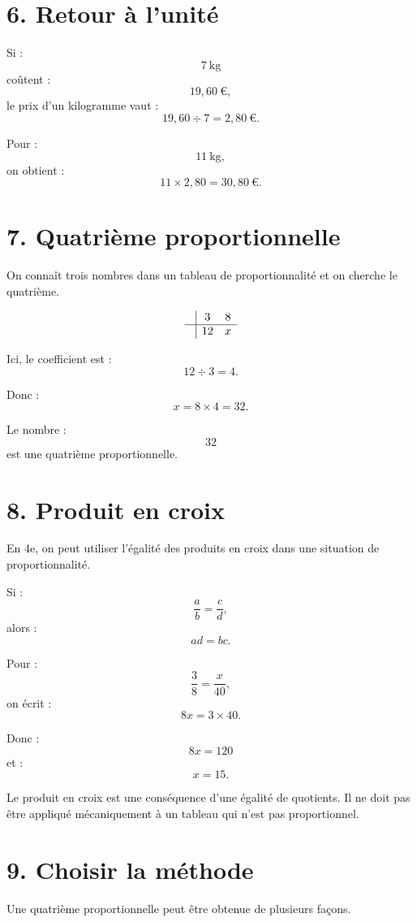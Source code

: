 \section{6. Retour à l'unité}

Si :
\[
7\ \text{kg}
\]
coûtent :
\[
19{,}60\ \text{€},
\]
le prix d'un kilogramme vaut :
\[
19{,}60\div7=2{,}80\ \text{€}.
\]

Pour :
\[
11\ \text{kg},
\]
on obtient :
\[
11\times2{,}80=30{,}80\ \text{€}.
\]

\section{7. Quatrième proportionnelle}

On connaît trois nombres dans un tableau de proportionnalité et on cherche le quatrième.

\[
\begin{array}{c|cc}
& 3 & 8\\
\hline
&12&x
\end{array}
\]

Ici, le coefficient est :
\[
12\div3=4.
\]

Donc :
\[
x=8\times4=32.
\]

Le nombre :
\[
32
\]
est une quatrième proportionnelle.

\section{8. Produit en croix}

En 4e, on peut utiliser l'égalité des produits en croix dans une situation de proportionnalité.

Si :
\[
\dfrac ab=\dfrac cd,
\]
alors :
\[
ad=bc.
\]

Pour :
\[
\dfrac38=\dfrac{x}{40},
\]
on écrit :
\[
8x=3\times40.
\]

Donc :
\[
8x=120
\]
et :
\[
x=15.
\]

\begin{attention}
Le produit en croix est une conséquence d'une égalité de quotients. Il ne doit pas être appliqué mécaniquement à un tableau qui n'est pas proportionnel.
\end{attention}

\section{9. Choisir la méthode}

Une quatrième proportionnelle peut être obtenue de plusieurs façons.

